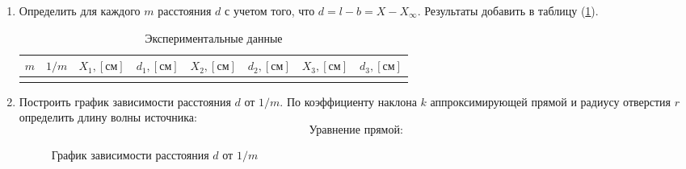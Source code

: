 \documentclass[12pt]{article}
\let\oldref\ref
\renewcommand{\ref}[1]{(\oldref{#1})}
\begin{document}
\begin{enumerate}[wide, labelwidth=!, labelindent=0pt]
        \item Определить для каждого $ m $ расстояния $ d $ с учетом того, что $ d = l - b = X - X_\infty $. Результаты добавить в таблицу \ref{tab:1}.
        \begin{table}[h!]
            \caption{Экспериментальные данные}
            \label{tab:1}
            \centering
            \begin{tabular}{|c|c|c|c|c|c|c|c|}
                \hline
                $ m $   &   $ 1/m $ &   $ X_1, [см]$ & $ d_1, [см] $ &   $ X_2, [см] $ & $ d_2, [см] $ &   $ X_3, [см] $ & $ d_3, [см] $ \\
                \hline
                \multicolumn{8}{|c|}{
                }   \\
                \hline
            \end{tabular}
        \end{table}
        \item Построить график зависимости расстояния $ d $ от $ 1/m $. По коэффициенту наклона $ k $ аппроксимирующей прямой и радиусу отверстия $ r $ определить длину волны источника:
        $$ \text{Уравнение прямой:} \, %
        $$
        \begin{figure}[h!]
            \label{graph:2}
            \caption{График зависимости расстояния $ d $ от $ 1/m $}
            \centering
\end{figure}
\end{enumerate}
\end{document}
